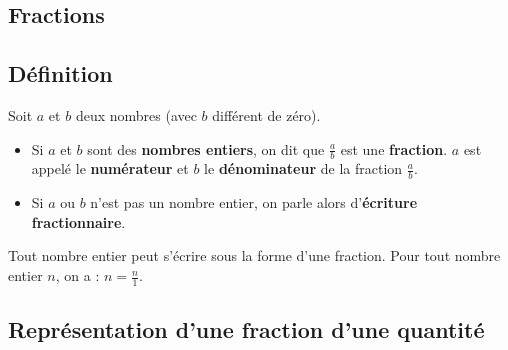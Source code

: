 \begin{pageCours}

\section{Fractions}

\subsection{Définition}

\begin{Def}
Soit $a$ et $b$ deux nombres (avec $b$ différent de zéro).
\begin{itemize}
\item Si $a$ et $b$ sont des \textbf{nombres entiers}, on dit que $\frac{a}{b}$ est une \textbf{fraction}.
$a$ est appelé le \textbf{numérateur} et $b$ le \textbf{dénominateur} de la fraction $\frac{a}{b}$.
\item Si $a$ ou $b$ n'est pas un nombre entier, on parle alors d'\textbf{écriture fractionnaire}.
\end{itemize}
\end{Def}

\begin{Pp}
Tout nombre entier peut s'écrire sous la forme d'une fraction. Pour tout nombre entier $n$, on a : $n=\frac{n}{1}$. 
\end{Pp}

\subsection{Représentation d'une fraction d'une quantité}


\end{pageCours}
